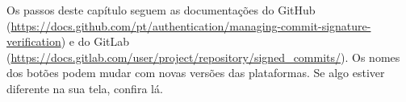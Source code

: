\begin{dica}
Os passos deste capítulo seguem as documentações do GitHub (\url{https://docs.github.com/pt/authentication/managing-commit-signature-verification}) e do GitLab (\url{https://docs.gitlab.com/user/project/repository/signed_commits/}). Os nomes dos botões podem mudar com novas versões das plataformas. Se algo estiver diferente na sua tela, confira lá.
\end{dica}
